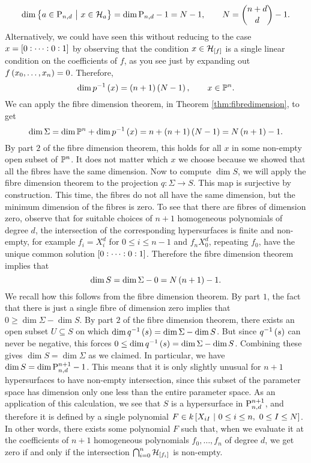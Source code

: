\begin{example*}
$$ \dim \cbr{a \in \P_{n, d} \st x \in \HHH_a} = \dim \P_{n, d} - 1 = N - 1, \qquad N = \binom{n + d}{d} - 1. $$
Alternatively, we could have seen this without reducing to the case $ x = \sbr{0 : \dots : 0 : 1} $ by observing that the condition $ x \in \HHH_{\sbr{f}} $ is a single linear condition on the coefficients of $ f $, as you see just by expanding out $ f\br{x_0, \dots, x_n} = 0 $. Therefore,
$$ \dim p^{-1}\br{x} = \br{n + 1}\br{N - 1}, \qquad x \in \PP^n. $$
We can apply the fibre dimension theorem, in Theorem \ref{thm:fibredimension}, to get
$$ \dim \Sigma = \dim \PP^n + \dim p^{-1}\br{x} = n + \br{n + 1}\br{N - 1} = N\br{n + 1} - 1. $$
By part $ 2 $ of the fibre dimension theorem, this holds for all $ x $ in some non-empty open subset of $ \PP^n $. It does not matter which $ x $ we choose because we showed that all the fibres have the same dimension. Now to compute $ \dim S $, we will apply the fibre dimension theorem to the projection $ q : \Sigma \to S $. This map is surjective by construction. This time, the fibres do not all have the same dimension, but the minimum dimension of the fibres is zero. To see that there are fibres of dimension zero, observe that for suitable choices of $ n + 1 $ homogeneous polynomials of degree $ d $, the intersection of the corresponding hypersurfaces is finite and non-empty, for example $ f_i = X_i^d $ for $ 0 \le i \le n - 1 $ and $ f_n X_0^d $, repeating $ f_0 $, have the unique common solution $ \sbr{0 : \dots : 0 : 1} $. Therefore the fibre dimension theorem implies that
$$ \dim S = \dim \Sigma - 0 = N\br{n + 1} - 1. $$
We recall how this follows from the fibre dimension theorem. By part $ 1 $, the fact that there is just a single fibre of dimension zero implies that $ 0 \ge \dim \Sigma - \dim S $. By part $ 2 $ of the fibre dimension theorem, there exists an open subset $ U \subseteq S $ on which $ \dim q^{-1}\br{s} = \dim \Sigma - \dim S $. But since $ q^{-1}\br{s} $ can never be negative, this forces $ 0 \le \dim q^{-1}\br{s} = \dim \Sigma - \dim S $. Combining these gives $ \dim S = \dim \Sigma $ as we claimed. In particular, we have $ \dim S = \dim \P_{n, d}^{n + 1} - 1 $. This means that it is only slightly unusual for $ n + 1 $ hypersurfaces to have non-empty intersection, since this subset of the parameter space has dimension only one less than the entire parameter space. As an application of this calculation, we see that $ S $ is a hypersurface in $ \P_{n, d}^{n + 1} $, and therefore it is defined by a single polynomial $ F \in k\sbr{X_{iI} \st 0 \le i \le n, \ 0 \le I \le N} $. In other words, there exists some polynomial $ F $ such that, when we evaluate it at the coefficients of $ n + 1 $ homogeneous polynomials $ f_0, \dots, f_n $ of degree $ d $, we get zero if and only if the intersection $ \bigcap_{i = 0}^n \HHH_{\sbr{f_i}} $ is non-empty.
\end{example*}

